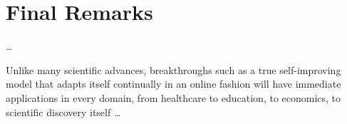 \documentclass[../main.tex]{subfiles}
\begin{document}

    



    \section{Final Remarks} \label{conclusions:final_remarks} 
    
    \dots

    Unlike many scientific advances, breakthroughs such as a true self-improving model that adapts itself continually in an online fashion will have immediate applications in every domain, from healthcare to education, to economics, to scientific discovery itself \dots 

\end{document}
